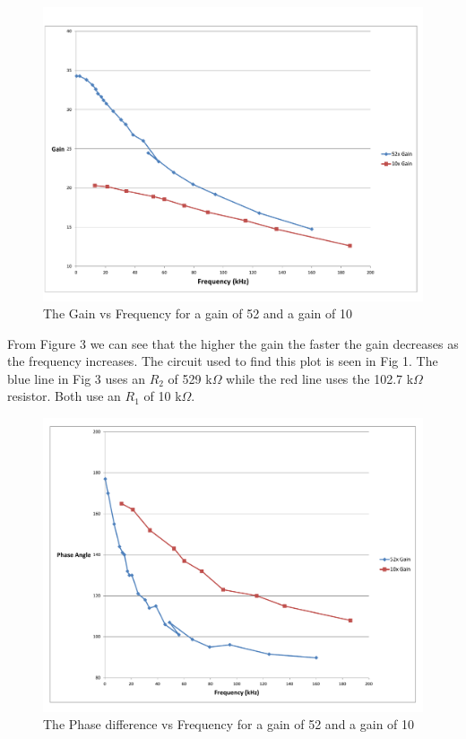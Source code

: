 \documentclass[11pt,letterpaper,onecolumn]{article}
\begin{document}
\begin{figure}[H]
    \centering
    \includegraphics[scale = .5]{Graph2.pdf}
    \caption{The Gain vs Frequency for a gain of 52 and a gain of 10}
    \label{fig:grph2}
\end{figure}

From Figure 3 we can see that the higher the gain the faster the gain decreases as the frequency increases. The circuit used to find this plot is seen in Fig 1. The blue line in Fig 3 uses an $R_2$ of 529 k$\Omega$ while the red line uses the 102.7 k$\Omega$ resistor. Both use an $R_1$ of 10 k$\Omega$. 

\begin{figure}[H]
    \centering
    \includegraphics[scale = .5]{Graph3.pdf}
    \caption{The Phase difference vs Frequency for a gain of 52 and a gain of 10}
    \label{fig:grph3}
\end{figure}
\end{document}
